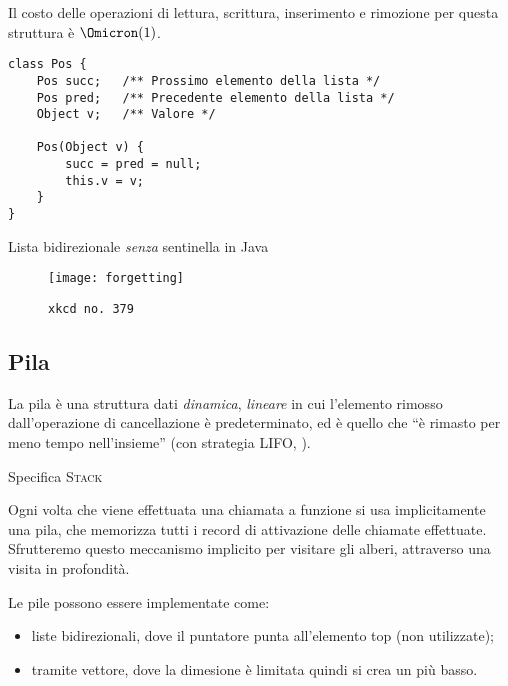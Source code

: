 Il costo delle operazioni di lettura, scrittura, inserimento e rimozione per questa struttura è \(\Omicron(1)\).

\begin{verbatim}
class Pos {
	Pos succ;	/** Prossimo elemento della lista */
	Pos pred;	/** Precedente elemento della lista */
	Object v;	/** Valore */

	Pos(Object v) {
		succ = pred = null;
		this.v = v;
	}
}
\end{verbatim}

\begin{listing}[!p]
	\caption{Lista bidirezionale \emph{senza} sentinella in Java}%
	\label{lst:java-lista-bidirezionale-sentinella}%
\end{listing}

\begin{figure}[H]
	\centering
	\texttt{[image: forgetting]}
	\caption[]{\texttt{xkcd no.\ 379}}
	\label{fig:forgetting}
\end{figure}

\subsection{Pila}

La pila è una struttura dati \emph{dinamica}, \emph{lineare} in cui l'elemento rimosso dall'operazione di cancellazione è predeterminato, ed è quello che \enquote{è rimasto per meno tempo nell'insieme} (con strategia \textsc{LIFO}, ).

\begin{algorithm}[H]
	\caption[Specifica pila]{Specifica \textsc{Stack}}
	
\end{algorithm}

Ogni volta che viene effettuata una chiamata a funzione si usa implicitamente una pila, che memorizza tutti i record di attivazione delle chiamate effettuate.
Sfrutteremo questo meccanismo implicito per visitare gli alberi, attraverso una visita in profondità.

Le pile possono essere implementate come:
\begin{itemize}
	\item liste bidirezionali, dove il puntatore punta all'elemento \textsf{top} (non utilizzate);
	\item tramite vettore, dove la dimesione è limitata quindi si crea un  più basso.
\end{itemize}

